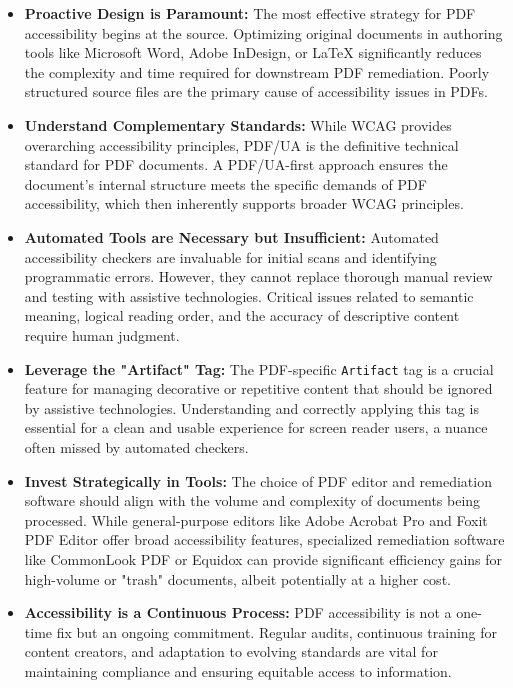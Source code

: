 \begin{itemize}[noitemsep,topsep=0pt]
    \item \textbf{Proactive Design is Paramount:} The most effective strategy for PDF accessibility begins at the source. Optimizing original documents in authoring tools like Microsoft Word, Adobe InDesign, or LaTeX significantly reduces the complexity and time required for downstream PDF remediation. Poorly structured source files are the primary cause of accessibility issues in PDFs.
    \item \textbf{Understand Complementary Standards:} While WCAG provides overarching accessibility principles, PDF/UA is the definitive technical standard for PDF documents. A PDF/UA-first approach ensures the document's internal structure meets the specific demands of PDF accessibility, which then inherently supports broader WCAG principles.
    \item \textbf{Automated Tools are Necessary but Insufficient:} Automated accessibility checkers are invaluable for initial scans and identifying programmatic errors. However, they cannot replace thorough manual review and testing with assistive technologies. Critical issues related to semantic meaning, logical reading order, and the accuracy of descriptive content require human judgment.
    \item \textbf{Leverage the "Artifact" Tag:} The PDF-specific \texttt{Artifact} tag is a crucial feature for managing decorative or repetitive content that should be ignored by assistive technologies. Understanding and correctly applying this tag is essential for a clean and usable experience for screen reader users, a nuance often missed by automated checkers.
    \item \textbf{Invest Strategically in Tools:} The choice of PDF editor and remediation software should align with the volume and complexity of documents being processed. While general-purpose editors like Adobe Acrobat Pro and Foxit PDF Editor offer broad accessibility features, specialized remediation software like CommonLook PDF or Equidox can provide significant efficiency gains for high-volume or "trash" documents, albeit potentially at a higher cost.
    \item \textbf{Accessibility is a Continuous Process:} PDF accessibility is not a one-time fix but an ongoing commitment. Regular audits, continuous training for content creators, and adaptation to evolving standards are vital for maintaining compliance and ensuring equitable access to information.
\end{itemize}

